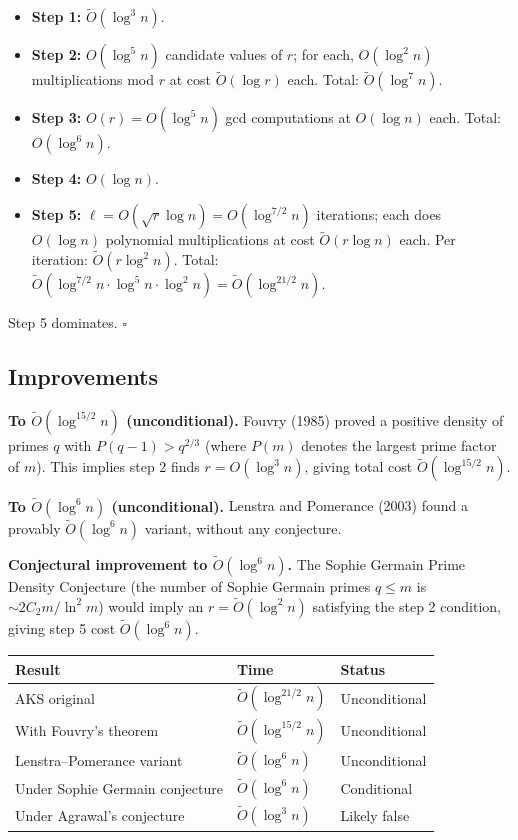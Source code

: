 \documentclass[12pt]{article}
\newcommand{\OO}{\widetilde{O}}
\begin{document}
\begin{itemize}
  \item \textbf{Step 1:} $\OO(\log^3 n)$.
  \item \textbf{Step 2:} $O(\log^5 n)$ candidate values of $r$; for each, $O(\log^2 n)$ multiplications mod $r$ at cost $\OO(\log r)$ each. Total: $\OO(\log^7 n)$.
  \item \textbf{Step 3:} $O(r)=O(\log^5 n)$ gcd computations at $O(\log n)$ each. Total: $O(\log^6 n)$.
  \item \textbf{Step 4:} $O(\log n)$.
  \item \textbf{Step 5:} $\ell=O(\sqrt{r}\log n)=O(\log^{7/2}n)$ iterations; each does $O(\log n)$ polynomial multiplications at cost $\OO(r\log n)$ each. Per iteration: $\OO(r\log^2 n)$. Total: $\OO(\log^{7/2}n\cdot\log^5 n\cdot\log^2 n)=\OO(\log^{21/2}n)$.
\end{itemize}
Step 5 dominates. $\square$

\subsection{Improvements}

\textbf{To $\OO(\log^{15/2} n)$ (unconditional).} Fouvry (1985) proved a positive density of primes $q$ with $P(q-1)>q^{2/3}$ (where $P(m)$ denotes the largest prime factor of $m$). This implies step 2 finds $r=O(\log^3 n)$, giving total cost $\OO(\log^{15/2}n)$.

\textbf{To $\OO(\log^6 n)$ (unconditional).} Lenstra and Pomerance (2003) found a provably $\OO(\log^6 n)$ variant, without any conjecture.

\textbf{Conjectural improvement to $\OO(\log^6 n)$.} The Sophie Germain Prime Density Conjecture (the number of Sophie Germain primes $q\leq m$ is $\sim 2C_2 m/\ln^2 m$) would imply an $r=\OO(\log^2 n)$ satisfying the step 2 condition, giving step 5 cost $\OO(\log^6 n)$.

\begin{center}
\begin{tabular}{lll}
\toprule
\textbf{Result} & \textbf{Time} & \textbf{Status}\\
\midrule
AKS original & $\OO(\log^{21/2}n)$ & Unconditional\\
With Fouvry's theorem & $\OO(\log^{15/2}n)$ & Unconditional\\
Lenstra--Pomerance variant & $\OO(\log^6 n)$ & Unconditional\\
Under Sophie Germain conjecture & $\OO(\log^6 n)$ & Conditional\\
Under Agrawal's conjecture & $\OO(\log^3 n)$ & Likely false\\
\bottomrule
\end{tabular}
\end{center}
\end{document}
